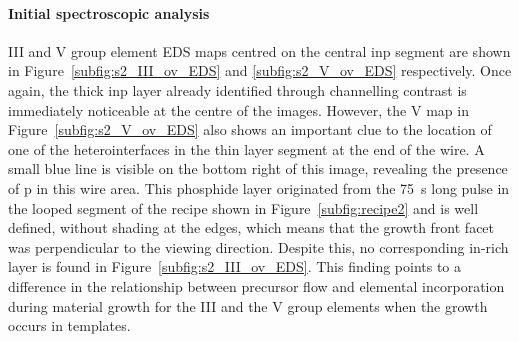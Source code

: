 \paragraph{Initial spectroscopic analysis} III and V group element EDS maps centred on the central \acs{inp} segment are shown in Figure~\ref{subfig:s2_III_ov_EDS} and \ref{subfig:s2_V_ov_EDS} respectively. Once again, the thick \acs{inp} layer already identified through channelling contrast is immediately noticeable at the centre of the images. However, the V map in Figure~\ref{subfig:s2_V_ov_EDS} also shows an important clue to the location of one of the heterointerfaces in the thin layer segment at the end of the wire. A small blue line is visible on the bottom right of this image, revealing the presence of \acl{p} in this wire area. This phosphide layer originated from the \qty{75}{\second} long pulse in the looped segment of the recipe shown in Figure~\ref{subfig:recipe2} and is well defined, without shading at the edges, which means that the growth front facet was perpendicular to the viewing direction. Despite this, no corresponding \acs{in}-rich layer is found in Figure~\ref{subfig:s2_III_ov_EDS}. This finding points to a difference in the relationship between precursor flow and elemental incorporation during material growth for the III and the V group elements when the growth occurs in templates.
\par


